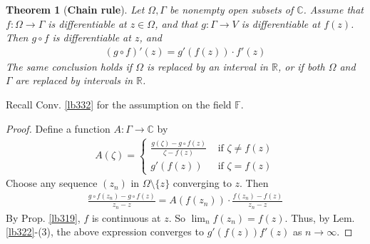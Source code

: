 \documentclass[12pt,b5paper,notitlepage]{article}
\theoremstyle{definition}
\theoremstyle{plain}
\newtheorem{thm}[df]{Theorem}
\newcommand{\Cbb}{\mathbb C}
\newcommand{\Rbb}{\mathbb R}
\newcommand{\Fbb}{\mathbb F}
\newcommand{\dps}{\displaystyle}
\numberwithin{equation}{section}
\begin{document}
\begin{thm}[\textbf{Chain rule}] \label{lb331}
Let $\Omega,\Gamma$ be nonempty open subsets of $\Cbb$. Assume that $f:\Omega\rightarrow\Gamma$ is differentiable at $z\in\Omega$, and that $g:\Gamma\rightarrow V$ is differentiable at $f(z)$. Then $g\circ f$ is differentiable at $z$, and
\begin{align}
(g\circ f)'(z)=g'(f(z))\cdot f'(z)\label{eq125}
\end{align}
The same conclusion holds if $\Omega$ is replaced by an interval in $\Rbb$, or if both $\Omega$ and $\Gamma$ are replaced by intervals in $\Rbb$.
\end{thm}

Recall Conv. \ref{lb332} for the assumption on the field $\Fbb$.


\begin{comment}
The most natural idea is to  compute the limit of
\begin{align*}
\frac{g\circ f(w)-g\circ f(z)}{w-z}=\frac{f(w)-f(z)}{w-z}\cdot\frac{g\circ f(w)-g\circ f(z)}{f(w)-f(z)}
\end{align*}
as $w\rightarrow z$ (understood as limits of nets as indicated in Rem. \ref{lb318}). However, the RHS of this expression does not make sense when $f(w)=f(z)$, and this bad situation may happen for many $w\in\Omega\setminus\{z\}$. We overcome this difficulty by changing the language of the proof slightly, without changing the key idea too much.
\end{comment}



\begin{proof}
Define a function $A:\Gamma\rightarrow\Cbb$ by
\begin{gather}\label{eq231}
A(\zeta)=\left\{
\begin{array}{ll}
\dps\frac{g(\zeta)-g\circ f(z)}{\zeta-f(z)}&\text{ if }\zeta\neq f(z)\\[2ex]
\dps g'(f(z))&\text{ if }\zeta=f(z)
\end{array}
\right.
\end{gather}
Choose any sequence $(z_n)$ in $\Omega\setminus\{z\}$ converging to $z$. Then
\begin{align*}
\frac{g\circ f(z_n)-g\circ f(z)}{z_n-z}=A(f(z_n))\cdot\frac{f(z_n)-f(z)}{z_n-z}
\end{align*}
By Prop. \ref{lb319}, $f$ is continuous at $z$. So $\lim_n f(z_n)=f(z)$. Thus, by Lem. \ref{lb322}-(3), the above expression converges to $g'(f(z))f'(z)$ as $n\rightarrow\infty$.
\end{proof}
\end{document}
